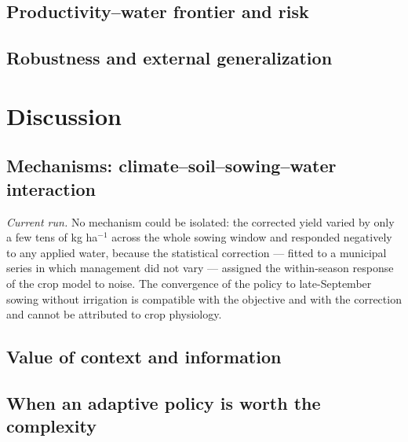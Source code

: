 \documentclass[times,final,authoryear]{elsarticle}
\begin{document}
\subsection{Productivity--water frontier and risk}
\label{subres_tradeoff}



\subsection{Robustness and external generalization}
\label{subres_generalization}





\section{Discussion}
\label{discussao}




\subsection{Mechanisms: climate--soil--sowing--water interaction}
\label{subdisc_mechanisms}



\emph{Current run.} No mechanism could be isolated: the corrected yield varied by only a few tens of kg ha$^{-1}$ across the whole sowing window and responded negatively to any applied water, because the statistical correction --- fitted to a municipal series in which management did not vary --- assigned the within-season response of the crop model to noise. The convergence of the policy to late-September sowing without irrigation is compatible with the objective and with the correction and cannot be attributed to crop physiology.

\subsection{Value of context and information}
\label{subdisc_information}



\subsection{When an adaptive policy is worth the complexity}
\label{subdisc_value}
\end{document}
